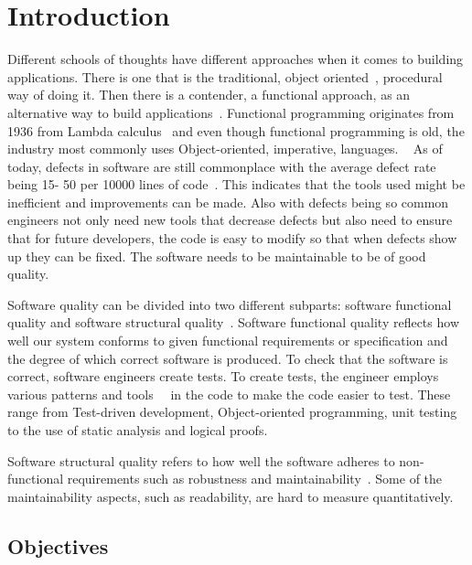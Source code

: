 \chapter{Introduction}\label{introduction}

Different schools of thoughts have different approaches when it comes to
building applications. There is one that is the traditional, object
oriented~\cite{rumbaugh1991object}, procedural way of doing it. Then there is a
contender, a functional approach, as an alternative way to build
applications~\cite{hughes1989functional}. Functional programming originates from
1936 from Lambda calculus~\cite{Turner} and even though functional programming
is old, the industry most commonly uses Object-oriented, imperative, languages.
~\cite{tiobe2013tiobe} As of today, defects in software are still commonplace
with the average defect rate being 15- 50 per 10000 lines of
code~\cite{McConnell:2004:CCS:1096143}. This indicates that the tools used might
be inefficient and improvements can be made. Also with defects being so common
engineers not only need new tools that decrease defects but also need to ensure
that for future developers, the code is easy to modify so that when defects show
up they can be fixed. The software needs to be maintainable to be of good
quality.

Software quality can be divided into two different subparts: software functional
quality and software structural quality~\cite{Pressman:2004:SEP:994110}.
Software functional quality reflects how well our system conforms to given
functional requirements or specification and the degree of which correct
software is produced.  To check that the software is correct, software engineers
create tests. To create tests, the engineer employs various patterns and
tools~\cite{beck2003test}~\cite{rumbaugh1991object} in the code to make the code
easier to test. These range from Test-driven development, Object-oriented
programming, unit testing to the use of static analysis and logical proofs. 

Software structural quality refers to how well the software adheres to
non-functional requirements such as robustness and
maintainability~\cite{Pressman:2004:SEP:994110}. Some of the maintainability
aspects, such as readability, are hard to measure quantitatively.  

\section{Objectives}

